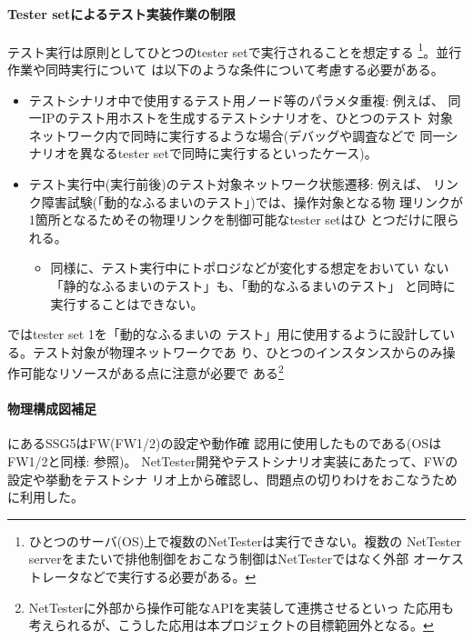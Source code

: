     \paragraph{Tester setによるテスト実装作業の制限}
テスト実行は原則としてひとつのtester setで実行されることを想定する
\footnote{ひとつのサーバ(OS)上で複数のNetTesterは実行できない。複数の
NetTester serverをまたいで排他制御をおこなう制御はNetTesterではなく外部
オーケストレータなどで実行する必要がある。}。並行作業や同時実行について
は以下のような条件について考慮する必要がある。
\begin{itemize}
 \item テストシナリオ中で使用するテスト用ノード等のパラメタ重複: 例えば、
       同一IPのテスト用ホストを生成するテストシナリオを、ひとつのテスト
       対象ネットワーク内で同時に実行するような場合(デバッグや調査などで
       同一シナリオを異なるtester setで同時に実行するといったケース)。
 \item テスト実行中(実行前後)のテスト対象ネットワーク状態遷移: 例えば、
       リンク障害試験(「動的なふるまいのテスト」)では、操作対象となる物
       理リンクが1箇所となるためその物理リンクを制御可能なtester setはひ
       とつだけに限られる。
       \begin{itemize}
        \item 同様に、テスト実行中にトポロジなどが変化する想定をおいてい
              ない「静的なふるまいのテスト」も、「動的なふるまいのテスト」
              と同時に実行することはできない。
       \end{itemize}
\end{itemize}

ではtester set 1を「動的なふるまいの
テスト」用に使用するように設計している。テスト対象が物理ネットワークであ
り、ひとつのインスタンスからのみ操作可能なリソースがある点に注意が必要で
ある\footnote{NetTesterに外部から操作可能なAPIを実装して連携させるといっ
た応用も考えられるが、こうした応用は本プロジェクトの目標範囲外となる。}

    \paragraph{物理構成図補足}
にあるSSG5はFW(FW1/2)の設定や動作確
認用に使用したものである(OSはFW1/2と同様: 参照)。
NetTester開発やテストシナリオ実装にあたって、FWの設定や挙動をテストシナ
リオ上から確認し、問題点の切りわけをおこなうために利用した。


